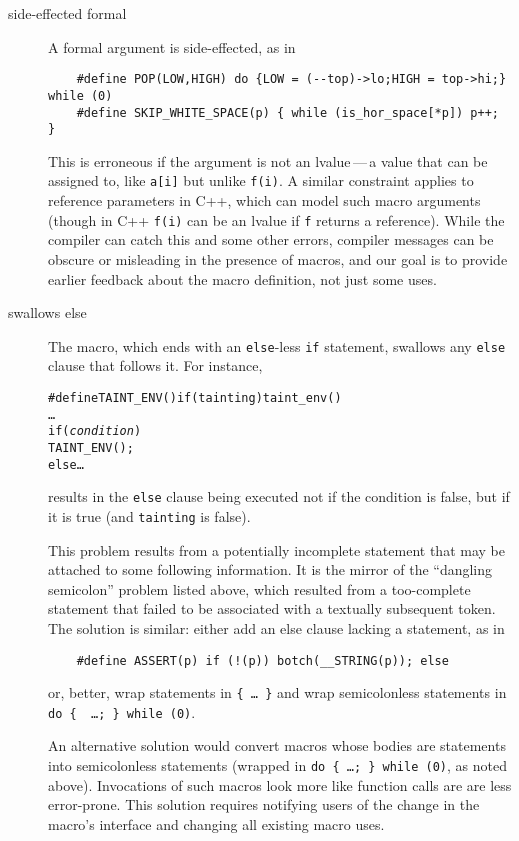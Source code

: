 \documentclass[10pt]{article}
\begin{document}
\begin{description}
\item[side-effected formal]
        A formal argument is side-effected, as in
\begin{verbatim}
    #define POP(LOW,HIGH) do {LOW = (--top)->lo;HIGH = top->hi;} while (0)
    #define SKIP_WHITE_SPACE(p) { while (is_hor_space[*p]) p++; }
\end{verbatim}
        This is erroneous if the
        argument is not an lvalue\,---\,a value that can be assigned to, like
        {\tt a[i]} but unlike {\tt f(i)}.  A similar constraint applies to
        reference parameters in C++, which can model such macro arguments
        (though in C++ {\tt f(i)} can be an lvalue if {\tt f} returns a reference).
        While the compiler can catch this and some other errors, compiler
        messages can be obscure or misleading in the presence of macros,
        and our goal is to provide earlier feedback about the macro
        definition, not just some uses.

\item[swallows else]
        The macro, which ends with an {\tt else}-less {\tt if} statement,
        swallows any {\tt else} clause that follows it.  For instance,
\begin{alltt}
    #define TAINT_ENV() if (tainting) taint_env()
    \ldots
    if ({\rm\em{}condition})
      TAINT_ENV();
    else \ldots
\end{alltt}
        results in the {\tt else} clause being executed not if  the
        condition is false, but if it is true (and {\tt tainting} is false).
        
        This problem results from a potentially incomplete statement that
        may be attached to some following information.  It is the mirror of
        the ``dangling semicolon'' problem listed above, which
        resulted from a too-complete statement that failed to be
        associated with a textually subsequent token.  The solution is
        similar: either add an else clause lacking a statement, as in
\begin{verbatim}
    #define ASSERT(p) if (!(p)) botch(__STRING(p)); else
\end{verbatim}
        or, better, wrap statements in {\tt \verb|{| \ldots\ \verb|}|} and
        wrap semicolonless statements in {\tt do \verb|{| {\rm
        \ldots}\verb|; }| while (0)}.
      
        An alternative solution would convert macros whose bodies are
        statements into semicolonless statements (wrapped in {\tt do \verb|{|
        {\rm \ldots}\verb|; }| while (0)}, as noted above).  Invocations of
        such macros look more like function calls are are less error-prone.
        This solution requires notifying users of the change in the macro's
        interface and changing all existing macro uses.
        

\end{description}
\end{document}
